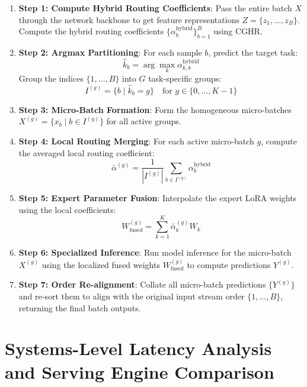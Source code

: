 \documentclass{article}
\theoremstyle{plain}
\theoremstyle{definition}
\theoremstyle{remark}
\begin{document}
\begin{enumerate}
    \item \textbf{Step 1: Compute Hybrid Routing Coefficients}: Pass the entire batch $X$ through the network backbone to get feature representations $Z = \{z_1, \dots, z_B\}$. Compute the hybrid routing coefficients $\{\alpha^{\text{hybrid}}_b\}_{b=1}^B$ using CGHR.
    \item \textbf{Step 2: Argmax Partitioning}: For each sample $b$, predict the target task:
    \begin{equation}
    \hat{k}_b = \arg\max_{k} \alpha^{\text{hybrid}}_{k, b}
    \end{equation}
    Group the indices $\{1, \dots, B\}$ into $G$ task-specific groups:
    \begin{equation}
    I^{(g)} = \{b \mid \hat{k}_b = g\} \quad \text{for } g \in \{0, \dots, K-1\}
    \end{equation}
    \item \textbf{Step 3: Micro-Batch Formation}: Form the homogeneous micro-batches $X^{(g)} = \{x_b \mid b \in I^{(g)}\}$ for all active groups.
    \item \textbf{Step 4: Local Routing Merging}: For each active micro-batch $g$, compute the averaged local routing coefficient:
    \begin{equation}
    \bar{\alpha}^{(g)} = \frac{1}{|I^{(g)}|} \sum_{b \in I^{(g)}} \alpha^{\text{hybrid}}_b
    \end{equation}
    \item \textbf{Step 5: Expert Parameter Fusion}: Interpolate the expert LoRA weights using the local coefficients:
    \begin{equation}
    W_{\text{fused}}^{(g)} = \sum_{k=1}^K \bar{\alpha}^{(g)}_k W_k
    \end{equation}
    \item \textbf{Step 6: Specialized Inference}: Run model inference for the micro-batch $X^{(g)}$ using the localized fused weights $W_{\text{fused}}^{(g)}$ to compute predictions $Y^{(g)}$.
    \item \textbf{Step 7: Order Re-alignment}: Collate all micro-batch predictions $\{Y^{(g)}\}$ and re-sort them to align with the original input stream order $\{1, \dots, B\}$, returning the final batch outputs.
\end{enumerate}

\section{Systems-Level Latency Analysis and Serving Engine Comparison}
\label{app:systems_analysis}
\end{document}

